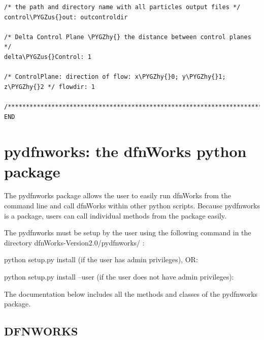 \documentclass[letterpaper,10pt,english]{sphinxmanual}
\def\PYGZus{\char`\_}
\def\PYGZhy{\char`\-}
\begin{document}
\begin{Verbatim}[commandchars=\\\{\}]
/* the path and directory name with all particles output files */
control\PYGZus{}out: outcontroldir

/* Delta Control Plane \PYGZhy{} the distance between control planes */
delta\PYGZus{}Control: 1

/* ControlPlane: direction of flow: x\PYGZhy{}0; y\PYGZhy{}1; z\PYGZhy{}2 */ flowdir: 1

/**************************************************************************/
END
\end{Verbatim}


\chapter{pydfnworks: the dfnWorks python package}
\label{pydfnworks:dfnworks-python-chapter}\label{pydfnworks::doc}\label{pydfnworks:pydfnworks-the-dfnworks-python-package}
The pydfnworks package allows the user to easily run dfnWorks from the command line and  call dfnWorks within other python scripts. Because pydfnworks is a package, users can call individual methods from the package easily.

The pydfnworks must be setup by the user using the following command in the directory dfnWorks-Version2.0/pydfnworks/ :

python setup.py install (if the user has admin privileges), OR:

python setup.py install --user (if the user does not have admin privileges):

The documentation below includes all the methods and classes of the pydfnworks package.


\section{DFNWORKS}
\label{pydfnworks:dfnworks}
\end{document}
